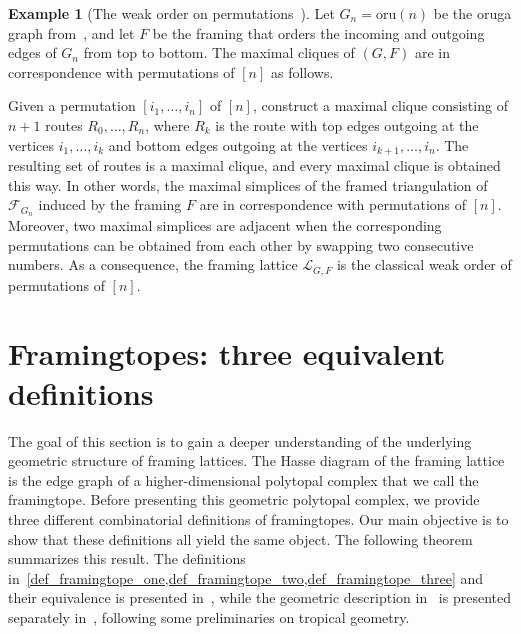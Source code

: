 \documentclass[12pt, reqno]{amsart}
\theoremstyle{plain}
\theoremstyle{definition}
\newtheorem{example}[theorem]{Example}
\numberwithin{equation}{section}
\newcommand\calF{\mathcal{F}}
\newcommand\scrL{\mathscr{L}}
\newcommand{\oru}[1]{\mathrm{oru}(#1)}
\begin{document}
\begin{example}[The weak order on permutations~\cite{vonBell_framing_2024}]
\label{ex_weak_order}
Let $G_n=\oru{n}$ be the oruga graph from~, and let $F$ be the framing that orders the incoming and outgoing edges of $G_n$ from top to bottom. The maximal cliques of $(G,F)$ are in correspondence with permutations of $[n]$ as follows.


Given a permutation $[i_1,\dots,i_n]$ of $[n]$, construct a maximal clique consisting of $n+1$ routes $R_0,\dots,R_n$, where $R_k$ is the route with top edges outgoing at the vertices $i_1,\dots, i_k$ and bottom edges outgoing at the vertices $i_{k+1},\dots, i_n$. The resulting set of routes is a maximal clique, and every maximal clique is obtained this way. In other words, the maximal simplices of the framed triangulation of $\calF_{G_n}$ induced by the framing $F$ are in correspondence with permutations of $[n]$. Moreover, two maximal simplices are adjacent when the corresponding permutations can be obtained from each other by swapping two consecutive numbers. As a consequence, the framing lattice $\scrL_{G,F}$ is the classical weak order of permutations of $[n]$.
\end{example}
\section{Framingtopes: three equivalent definitions}
The goal of this section is to gain a deeper understanding of the underlying geometric structure of framing lattices. The Hasse diagram of the framing lattice is the edge graph of a higher-dimensional polytopal complex that we call the framingtope. Before presenting this geometric polytopal complex, we provide three different combinatorial definitions of framingtopes. Our main objective is to show that these definitions all yield the same object. The following theorem summarizes this result. The definitions in~\cref{def_framingtope_one,def_framingtope_two,def_framingtope_three} and their equivalence is presented in~, while the geometric description in~ is presented separately in~, following some preliminaries on tropical geometry.
\end{document}
